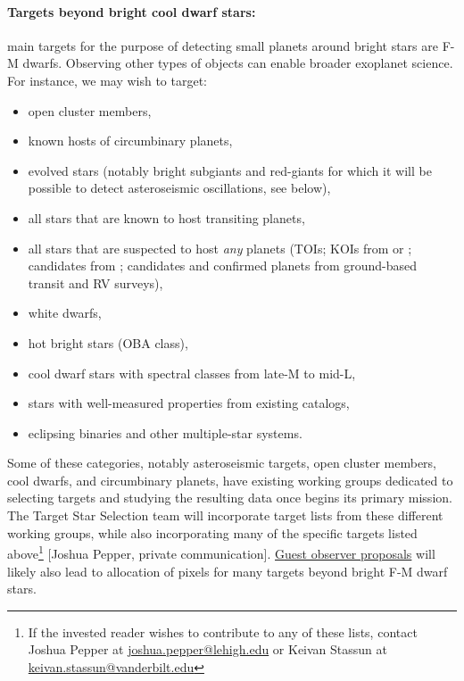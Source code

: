 \paragraph{Targets beyond bright cool dwarf stars:}
\tesss main targets for the purpose of detecting small planets around bright stars are F-M dwarfs.
Observing other types of objects can enable broader exoplanet science.
For instance, we may wish to target:
\begin{itemize}
	\item open cluster members,
	\item known hosts of circumbinary planets,
	\item evolved stars (notably bright subgiants and red-giants for which it will be possible to detect asteroseismic oscillations, see below),
	\item all stars that are known to host transiting planets,
	\item all stars that are suspected to host \textit{any} planets (TOIs; KOIs from \kepler or \ktwo; candidates from \corot\!; candidates and confirmed planets from ground-based transit and RV surveys),
	\item white dwarfs,
	\item hot bright stars (OBA class),
	\item cool dwarf stars with spectral classes from late-M to mid-L,
	\item stars with well-measured properties from existing catalogs,

	\item eclipsing binaries and other multiple-star systems.
\end{itemize}
Some of these categories, notably asteroseismic targets, open cluster members, cool dwarfs, and circumbinary planets, have existing working groups dedicated to selecting targets and studying the resulting data once \tess begins its primary mission.
The \tess Target Star Selection team will incorporate target lists from these different working groups, while also incorporating many of the specific targets listed above\footnote{If the invested reader wishes to contribute to any of these lists, contact Joshua Pepper at \href{mailto:joshua.pepper@lehigh.edu}{joshua.pepper@lehigh.edu} or Keivan Stassun at \href{mailto:keivan.stassun@vanderbilt.edu}{keivan.stassun@vanderbilt.edu}} [Joshua Pepper, private communication].
\href{https://heasarc.gsfc.nasa.gov/docs/tess/}{Guest observer proposals} will likely also lead to allocation of pixels for many targets beyond bright F-M dwarf stars.

